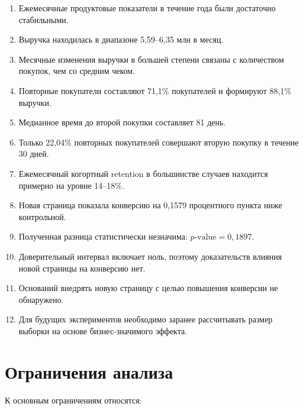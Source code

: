 \documentclass[12pt,a4paper]{extarticle}
\begin{document}
\begin{enumerate}
    \item Ежемесячные продуктовые показатели в течение года были
    достаточно стабильными.

    \item Выручка находилась в диапазоне 5,59--6,35 млн в месяц.

    \item Месячные изменения выручки в большей степени связаны
    с количеством покупок, чем со средним чеком.

    \item Повторные покупатели составляют 71,1\% покупателей
    и формируют 88,1\% выручки.

    \item Медианное время до второй покупки составляет 81 день.

    \item Только 22,04\% повторных покупателей совершают вторую
    покупку в течение 30 дней.

    \item Ежемесячный когортный retention в большинстве случаев
    находится примерно на уровне 14--18\%.

    \item Новая страница показала конверсию на 0,1579 процентного
    пункта ниже контрольной.

    \item Полученная разница статистически незначима:
    \(p\text{-value}=0{,}1897\).

    \item Доверительный интервал включает ноль, поэтому доказательств
    влияния новой страницы на конверсию нет.

    \item Оснований внедрять новую страницу с целью повышения
    конверсии не обнаружено.

    \item Для будущих экспериментов необходимо заранее рассчитывать
    размер выборки на основе бизнес-значимого эффекта.
\end{enumerate}

\newpage
\section{Ограничения анализа}

К основным ограничениям относятся:
\end{document}
